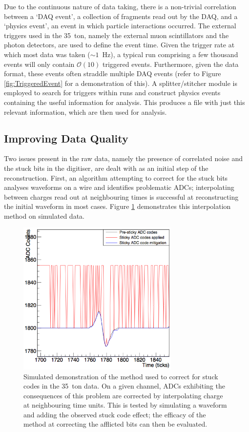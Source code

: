 Due to the continuous nature of data taking, there is a non-trivial correlation between a `DAQ event', a collection of fragments read out by the DAQ, and a `physics event', an event in which particle interactions occurred.  The external triggers used in the 35~ton, namely the external muon scintillators and the photon detectors, are used to define the event time.  Given the trigger rate at which most data was taken ($\sim1$~Hz), a typical run comprising a few thousand events will only contain $\mathcal{O}(10)$ triggered events.  Furthermore, given the data format, these events often straddle multiple DAQ events (refer to Figure \ref{fig:TriggeredEvent} for a demonstration of this).  A splitter/stitcher module is employed to search for triggers within runs and construct physics events containing the useful information for analysis.  This produces a file with just this relevant information, which are then used for analysis.

\subsection{Improving Data Quality}\label{sec:ImprovingDataQuality}

Two issues present in the raw data, namely the presence of correlated noise and the stuck bits in the digitiser, are dealt with as an initial step of the reconstruction.  First, an algorithm attempting to correct for the stuck bits analyses waveforms on a wire and identifies problematic ADCs; interpolating between charges read out at neighbouring times is successful at reconstructing the initial waveform in most cases.  Figure \ref{fig:StuckBitInterpolation} demonstrates this interpolation method on simulated data.

\begin{figure}[h]
  \centering
  \includegraphics[width=8cm]{stuckbitsremoval.png}
  \caption[Correcting for stuck codes in the 35~ton data]{Simulated demonstration of the method used to correct for stuck codes in the 35~ton data.  On a given channel, ADCs exhibiting the consequences of this problem are corrected by interpolating charge at neighbouring time units.  This is tested by simulating a waveform and adding the observed stuck code effect; the efficacy of the method at correcting the afflicted bits can then be evaluated.}
  \label{fig:StuckBitInterpolation}
\end{figure}

